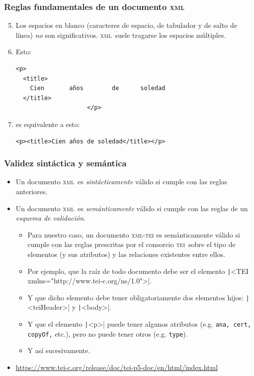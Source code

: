 \documentclass[%
  handout, %
  xcolor=svgnames]{beamer}
\newcommand*{\rojoit}[1]{\textit{\textcolor[HTML]{8B0000}{#1}}}
\newcommand*{\azul}[1]{\textcolor[HTML]{14145A}{#1}}
\newcommand*{\TEI}{\textsc{tei}}
\newcommand*{\XML}{\textsc{xml}}
\begin{document}
\begin{frame}[fragile]
  \frametitle{Reglas fundamentales de un documento \XML}
  \begin{enumerate}
      \setcounter{enumi}{4}
    \item Los espacios en blanco (caracteres de espacio, de tabulador y de salto de línea) \textit{no} son significativos. \XML\ suele tragarse los espacios múltiples.

      \medskip
      
    \item[] Esto:
\begin{verbatim}
<p>
  <title>
    Cien       años        de      soledad
  </title>
                    </p>
\end{verbatim}

      \bigskip

    \item[] es equivalente a esto:
\small
\begin{verbatim}
<p><title>Cien años de soledad</title></p>
\end{verbatim}      

      
  \end{enumerate}
\end{frame}


\begin{frame}[fragile]
  \frametitle{Validez sintáctica y semántica}
  \begin{itemize}
    \item Un documento \XML\ es \rojoit{sintácticamente} válido si cumple con las reglas anteriores.
    \item Un documento \XML\ es \rojoit{semánticamente} válido si cumple con las reglas de un \textit{esquema de validación}.
      
      \begin{itemize}
        \item Para nuestro caso, un documento \azul{\XML-\TEI} es semánticamente válido si cumple con las reglas prescritas por el consorcio \TEI\ sobre el tipo de elementos (y sus atributos) y las relaciones existentes entre ellos.
        \item Por ejemplo, que la raíz de todo documento debe ser el elemento \texttt|<TEI xmlns="http://www.tei-c.org/ns/1.0">|.
        \item Y que dicho elemento debe tener obligatoriamente dos elementos hijos: \texttt|<teiHeader>| y \texttt|<body>|.
        \item Y que el elemento \texttt|<p>| puede tener algunos atributos (e.g. \texttt{ana, cert, copyOf,} etc.), pero no puede tener otros (e.g. \texttt{type}).
        \item Y así sucesivamente.
      \end{itemize}
      
    \item[] \url{https://www.tei-c.org/release/doc/tei-p5-doc/en/html/index.html}
  \end{itemize}
\end{frame}
\end{document}
